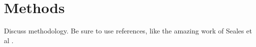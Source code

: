 \section{Methods}

Discuss methodology. Be sure to use references, like the amazing work of
Seales et al \cite{seales2016damage}.

